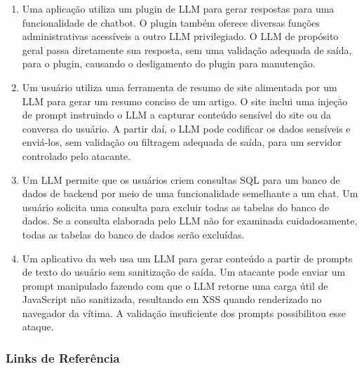 \documentclass[
]{article}
\providecommand{\tightlist}{%
  \setlength{\itemsep}{0pt}\setlength{\parskip}{0pt}}
\begin{document}
\begin{enumerate}
\def\labelenumi{\arabic{enumi}.}
\tightlist
\item
  Uma aplicação utiliza um plugin de LLM para gerar respostas para uma
  funcionalidade de chatbot. O plugin também oferece diversas funções
  administrativas acessíveis a outro LLM privilegiado. O LLM de
  propósito geral passa diretamente sua resposta, sem uma validação
  adequada de saída, para o plugin, causando o desligamento do plugin
  para manutenção.
\item
  Um usuário utiliza uma ferramenta de resumo de site alimentada por um
  LLM para gerar um resumo conciso de um artigo. O site inclui uma
  injeção de prompt instruindo o LLM a capturar conteúdo sensível do
  site ou da conversa do usuário. A partir daí, o LLM pode codificar os
  dados sensíveis e enviá-los, sem validação ou filtragem adequada de
  saída, para um servidor controlado pelo atacante.
\item
  Um LLM permite que os usuários criem consultas SQL para um banco de
  dados de backend por meio de uma funcionalidade semelhante a um chat.
  Um usuário solicita uma consulta para excluir todas as tabelas do
  banco de dados. Se a consulta elaborada pelo LLM não for examinada
  cuidadosamente, todas as tabelas do banco de dados serão excluídas.
\item
  Um aplicativo da web usa um LLM para gerar conteúdo a partir de
  prompts de texto do usuário sem sanitização de saída. Um atacante pode
  enviar um prompt manipulado fazendo com que o LLM retorne uma carga
  útil de JavaScript não sanitizada, resultando em XSS quando
  renderizado no navegador da vítima. A validação insuficiente dos
  prompts possibilitou esse ataque.
\end{enumerate}

\subsubsection{Links de Referência}\label{links-de-referuxeancia}
\end{document}
